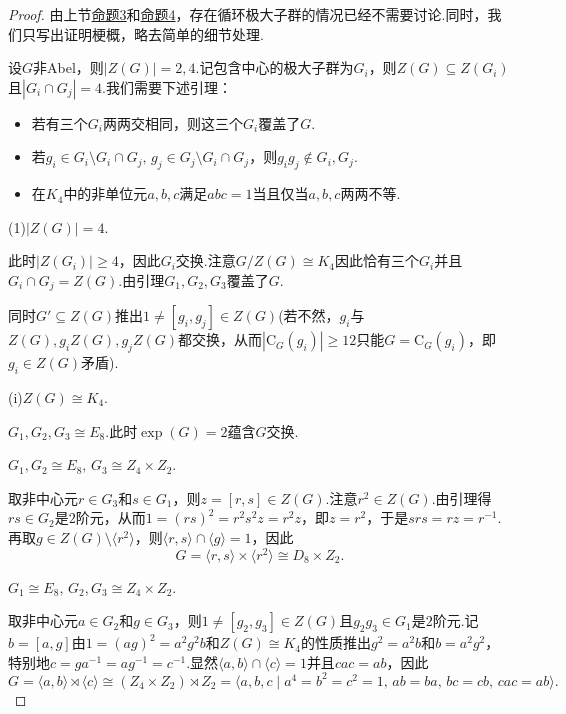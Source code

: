 \begin{proof}
	由上节\hyperlink{prop:pGroupCyclicMax1}{命题3}和\hyperlink{prop:pGroupCyclicMax2}{命题4}，存在循环极大子群的情况已经不需要讨论.同时，我们只写出证明梗概，略去简单的细节处理.

	设$G$非Abel，则$|Z(G)|=2,4$.记包含中心的极大子群为$G_i$，则$Z(G)\subseteq Z(G_i)$且$|G_i\cap G_j|=4$.我们需要下述引理：
	\begin{itemize}
		\item 若有三个$G_i$两两交相同，则这三个$G_i$覆盖了$G$.
		\item 若$g_i\in G_i\setminus G_i\cap G_j,\,g_j\in G_j\setminus G_i\cap G_j$，则$g_ig_j\notin G_i,G_j$.
		\item 在$K_4$中的非单位元$a,b,c$满足$abc=1$当且仅当$a,b,c$两两不等.
	\end{itemize}

	{\color{Goldenrod}(1)$|Z(G)|=4$}.
	
	此时$|Z(G_i)|\ge 4$，因此$G_i$交换.注意$G/Z(G)\cong K_4$因此恰有三个$G_i$并且$G_i\cap G_j=Z(G)$.由引理$G_1,G_2,G_3$覆盖了$G$.
	
	同时$G'\subseteq Z(G)$推出$1\ne[g_i,g_j]\in Z(G)$(若不然，$g_i$与$Z(G),g_iZ(G),g_jZ(G)$都交换，从而$|\mathrm{C}_G(g_i)|\ge 12$只能$G=\mathrm{C}_G(g_i)$，即$g_i\in Z(G)$矛盾).

	{\color{CornflowerBlue}(i)$Z(G)\cong K_4$}.
	
	{\color{IndianRed}\bullet$G_1,G_2,G_3\cong E_8$}.此时$\exp(G)=2$蕴含$G$交换.

	{\color{IndianRed}\bullet$G_1,G_2\cong E_8,\,G_3\cong Z_4\times Z_2$}.

	取非中心元$r\in G_3$和$s\in G_1$，则$z=[r,s]\in Z(G)$.注意$r^2\in Z(G)$.由引理得$rs\in G_2$是$2$阶元，从而$1=(rs)^2=r^2s^2z=r^2z$，即$z=r^2$，于是$srs=rz=r^{-1}$.再取$g\in Z(G)\setminus\langle r^2\rangle $，则$\langle r,s\rangle \cap\langle g\rangle=1$，因此
	\[
		G=\langle r,s\rangle\times\langle r^2\rangle\cong D_8\times Z_2.
	\]

	{\color{IndianRed}\bullet$G_1\cong E_8,\,G_2,G_3\cong Z_4\times Z_2$}.

	取非中心元$a\in G_2$和$g\in G_3$，则$1\ne[g_2,g_3]\in Z(G)$且$g_2g_3\in G_1$是$2$阶元.记$b=[a,g]$由$1=(ag)^2=a^2g^2b$和$Z(G)\cong K_4$的性质推出$g^2=a^2b$和$b=a^2g^2$，特别地$c=ga^{-1}=ag^{-1}=c^{-1}$.显然$\langle a,b\rangle \cap\langle c\rangle=1$并且$cac=ab$，因此
	\[
		G=\langle a,b\rangle\rtimes\langle c\rangle\cong(Z_4\times Z_2)\rtimes Z_2=\langle a,b,c\mid a^4=b^2=c^2=1,\,ab=ba,\,bc=cb,\,cac=ab\rangle.
	\]


\end{proof}
